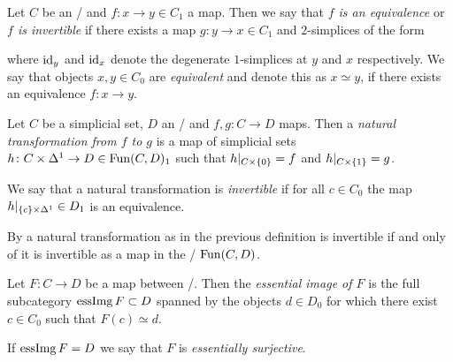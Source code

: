 \begin{definition}
    Let $C$ be an \inftycat/ and $f\colon x\to y\in C_1$ a map.
    Then we say that \emph{$f$ is an equivalence} or \emph{$f$ is invertible} if there exists a map $g\colon y\to x\in C_1$ and $2$-simplices of the form
    \begin{center}
    \end{center}
    where $\text{id}_y$ and $\text{id}_x$ denote the degenerate $1$-simplices at $y$ and $x$ respectively.
    We say that objects $x,y\in C_0$ are \emph{equivalent} and denote this as $x\simeq y$, if there exists an equivalence $f\colon x\to y$.
\end{definition}
\begin{definition}
    Let $C$ be a simplicial set, $D$ an \inftycat/ and $f,g\colon C\to D$ maps.
    Then a \emph{natural transformation from $f$ to $g$} is a map of simplicial sets $h\colon C\times\Delta^1\to D\in\operatorname{Fun}(C,D)_1$ such that $h|_{C\times\left\lbrace0\right\rbrace}=f$ and $h|_{C\times\left\lbrace1\right\rbrace}=g$.
    
    We say that a natural transformation is \emph{invertible} if for all $c\in C_0$ the map $h|_{\left\lbrace c\right\rbrace\times\Delta^1}\in D_1$ is an equivalence.
\end{definition}
\begin{remark}
    By \cite[Corollary 3.5.12]{cisinski_2019} a natural transformation as in the previous definition is invertible if and only of it is invertible as a map in the \inftycat/ $\operatorname{Fun}(C,D)$.
\end{remark}
\begin{definition}
    Let $F\colon C\to D$ be a map between \inftycats/.
    Then the \emph{essential image of $F$} is the full subcategory $\operatorname{essImg} F\subset D$ spanned by the objects $d\in D_0$ for which there exist $c\in C_0$ such that $F(c)\simeq d$.

    If $\operatorname{essImg} F=D$ we say that $F$ is \emph{essentially surjective}.
\end{definition}
